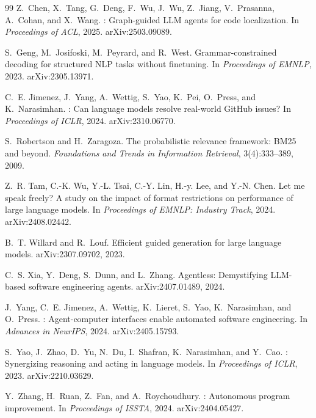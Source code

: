 \documentclass[11pt]{article}
\begin{document}
\begin{thebibliography}{99}\small
{}
Z.~Chen, X.~Tang, G.~Deng, F.~Wu, J.~Wu, Z.~Jiang, V.~Prasanna, A.~Cohan, and X.~Wang.
: Graph-guided {LLM} agents for code localization.
\newblock In \emph{Proceedings of ACL}, 2025.
\newblock arXiv:2503.09089.

S.~Geng, M.~Josifoski, M.~Peyrard, and R.~West.
\newblock Grammar-constrained decoding for structured {NLP} tasks without finetuning.
\newblock In \emph{Proceedings of EMNLP}, 2023.
\newblock arXiv:2305.13971.

C.~E. Jimenez, J.~Yang, A.~Wettig, S.~Yao, K.~Pei, O.~Press, and K.~Narasimhan.
: Can language models resolve real-world {GitHub} issues?
\newblock In \emph{Proceedings of ICLR}, 2024.
\newblock arXiv:2310.06770.

S.~Robertson and H.~Zaragoza.
\newblock The probabilistic relevance framework: {BM25} and beyond.
\newblock \emph{Foundations and Trends in Information Retrieval}, 3(4):333--389, 2009.

Z.~R. Tam, C.-K. Wu, Y.-L. Tsai, C.-Y. Lin, H.-y. Lee, and Y.-N. Chen.
\newblock Let me speak freely? {A} study on the impact of format restrictions on performance of large language models.
\newblock In \emph{Proceedings of EMNLP: Industry Track}, 2024.
\newblock arXiv:2408.02442.

B.~T. Willard and R.~Louf.
\newblock Efficient guided generation for large language models.
\newblock arXiv:2307.09702, 2023.

C.~S. Xia, Y.~Deng, S.~Dunn, and L.~Zhang.
\newblock Agentless: Demystifying {LLM}-based software engineering agents.
\newblock arXiv:2407.01489, 2024.

J.~Yang, C.~E. Jimenez, A.~Wettig, K.~Lieret, S.~Yao, K.~Narasimhan, and O.~Press.
: Agent-computer interfaces enable automated software engineering.
\newblock In \emph{Advances in NeurIPS}, 2024.
\newblock arXiv:2405.15793.

S.~Yao, J.~Zhao, D.~Yu, N.~Du, I.~Shafran, K.~Narasimhan, and Y.~Cao.
: Synergizing reasoning and acting in language models.
\newblock In \emph{Proceedings of ICLR}, 2023.
\newblock arXiv:2210.03629.

Y.~Zhang, H.~Ruan, Z.~Fan, and A.~Roychoudhury.
: Autonomous program improvement.
\newblock In \emph{Proceedings of ISSTA}, 2024.
\newblock arXiv:2404.05427.
\end{thebibliography}
\end{document}

